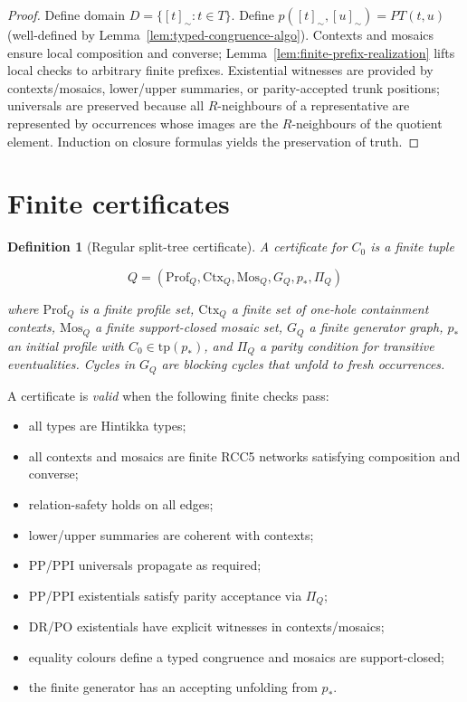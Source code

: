 \documentclass[11pt]{article}
\newcommand{\tp}{\mathrm{tp}}
\newtheorem{definition}[theorem]{Definition}
\begin{document}
\begin{proof}
Define domain $D=\{[t]_\sim:t\in T\}$. Define $p([t]_\sim,[u]_\sim)=PT(t,u)$
(well-defined by Lemma~\ref{lem:typed-congruence-algo}). Contexts and mosaics
ensure local composition and converse; Lemma~\ref{lem:finite-prefix-realization} lifts
local checks to arbitrary finite prefixes. Existential witnesses are provided
by contexts/mosaics, lower/upper summaries, or parity-accepted trunk positions;
universals are preserved because all $R$-neighbours of a representative are
represented by occurrences whose images are the $R$-neighbours of the quotient
element. Induction on closure formulas yields the preservation of truth.
\end{proof}

\section{Finite certificates}
\label{sec:certificates}

\begin{definition}[Regular split-tree certificate]
A certificate for $C_0$ is a finite tuple


\[
Q=(\mathrm{Prof}_Q,\mathrm{Ctx}_Q,\mathrm{Mos}_Q,G_Q,p_*,\Pi_Q)
\]


where $\mathrm{Prof}_Q$ is a finite profile set, $\mathrm{Ctx}_Q$ a finite set
of one-hole containment contexts, $\mathrm{Mos}_Q$ a finite support-closed
mosaic set, $G_Q$ a finite generator graph, $p_*$ an initial profile with
$C_0\in\tp(p_*)$, and $\Pi_Q$ a parity condition for transitive eventualities.
Cycles in $G_Q$ are blocking cycles that unfold to fresh occurrences.
\end{definition}

A certificate is \emph{valid} when the following finite checks pass:
\begin{itemize}
  \item all types are Hintikka types;
  \item all contexts and mosaics are finite RCC5 networks satisfying
    composition and converse;
  \item relation-safety holds on all edges;
  \item lower/upper summaries are coherent with contexts;
  \item PP/PPI universals propagate as required;
  \item PP/PPI existentials satisfy parity acceptance via $\Pi_Q$;
  \item DR/PO existentials have explicit witnesses in contexts/mosaics;
  \item equality colours define a typed congruence and mosaics are support-closed;
  \item the finite generator has an accepting unfolding from $p_*$.
\end{itemize}
\end{document}
